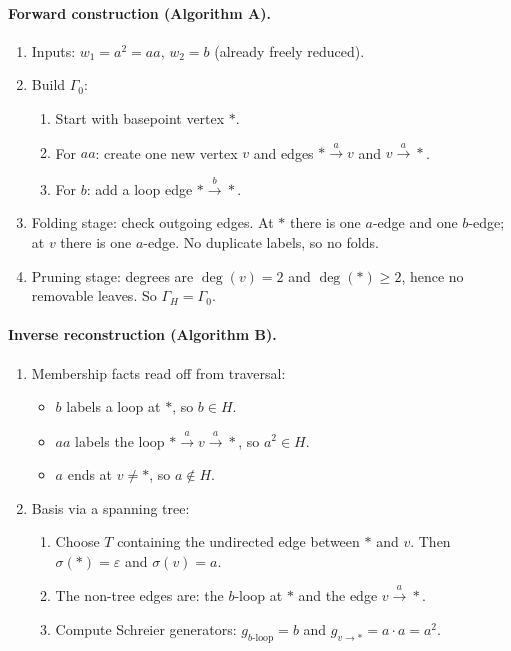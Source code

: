 \documentclass[11pt]{article}
\theoremstyle{definition}
\theoremstyle{plain}
\theoremstyle{remark}
\begin{document}
\paragraph{Forward construction (Algorithm A).}
\begin{enumerate}[leftmargin=2.2em]
\item Inputs: $w_1=a^2=aa$, $w_2=b$ (already freely reduced).
\item Build $\Gamma_0$:
\begin{enumerate}[leftmargin=2em]
\item Start with basepoint vertex $*$.
\item For $aa$: create one new vertex $v$ and edges $*\xrightarrow{a}v$ and $v\xrightarrow{a}*$.
\item For $b$: add a loop edge $*\xrightarrow{b}*$.
\end{enumerate}
\item Folding stage: check outgoing edges.
At $*$ there is one $a$-edge and one $b$-edge; at $v$ there is one $a$-edge. No duplicate labels, so no folds.
\item Pruning stage: degrees are $\deg(v)=2$ and $\deg(*)\ge 2$, hence no removable leaves. So $\Gamma_H=\Gamma_0$.
\end{enumerate}

\paragraph{Inverse reconstruction (Algorithm B).}
\begin{enumerate}[leftmargin=2.2em]
\item Membership facts read off from traversal:
\begin{itemize}[leftmargin=2em]
\item $b$ labels a loop at $*$, so $b\in H$.
\item $aa$ labels the loop $*\xrightarrow{a}v\xrightarrow{a}*$, so $a^2\in H$.
\item $a$ ends at $v\neq *$, so $a\notin H$.
\end{itemize}
\item Basis via a spanning tree:
\begin{enumerate}[leftmargin=2em]
\item Choose $T$ containing the undirected edge between $*$ and $v$.
Then $\sigma(*)=\varepsilon$ and $\sigma(v)=a$.
\item The non-tree edges are:
the $b$-loop at $*$ and the edge $v\xrightarrow{a}*$.
\item Compute Schreier generators:
$g_{b\text{-loop}}=b$ and $g_{v\to *}=a\cdot a=a^2$.
\end{enumerate}
\end{enumerate}
\end{document}
